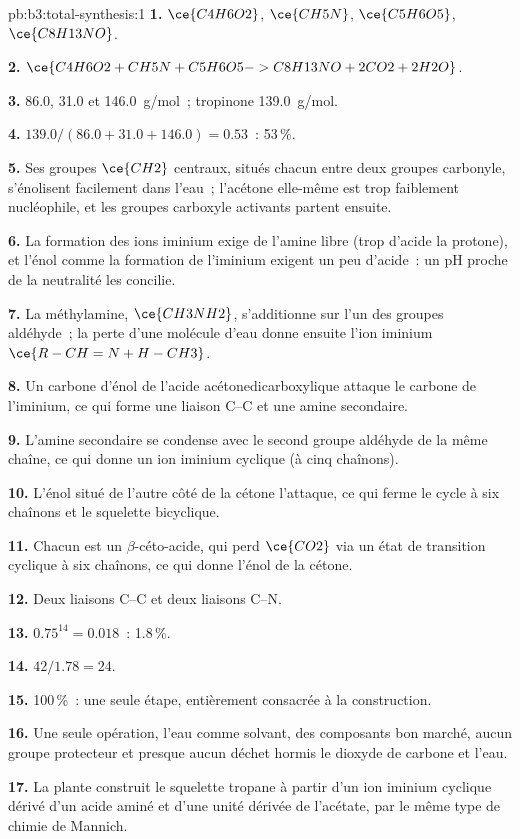 \begin{solution}{pb:b3:total-synthesis:1}
\textbf{1.} $\ce{C4H6O2}$, $\ce{CH5N}$, $\ce{C5H6O5}$, $\ce{C8H13NO}$.

\textbf{2.} $\ce{C4H6O2 + CH5N + C5H6O5 -> C8H13NO + 2CO2 + 2H2O}$.

\textbf{3.} 86.0, 31.0 et \qty{146.0}{g/mol}~; tropinone \qty{139.0}{g/mol}.

\textbf{4.} $139.0/(86.0 + 31.0 + 146.0) = 0.53$~: 53\,\%.

\textbf{5.} Ses groupes $\ce{CH2}$ centraux, situés chacun entre deux groupes carbonyle, s'énolisent facilement dans
l'eau~; l'acétone elle-même est trop faiblement nucléophile, et les groupes
carboxyle activants partent ensuite.

\textbf{6.} La formation des ions iminium exige de l'amine libre (trop
d'acide la protone), et l'énol comme la formation de l'iminium exigent un
peu d'acide~: un pH proche de la neutralité les concilie.

\textbf{7.} La méthylamine, $\ce{CH3NH2}$, s'additionne sur l'un des groupes aldéhyde~; la perte d'une molécule d'eau donne ensuite l'ion iminium
$\ce{R-CH=N+H-CH3}$.

\textbf{8.} Un carbone d'énol de l'acide acétonedicarboxylique attaque le
carbone de l'iminium, ce qui forme une liaison C--C et une amine
secondaire.

\textbf{9.} L'amine secondaire se condense avec le second groupe aldéhyde de
la même chaîne, ce qui donne un ion iminium cyclique (à cinq chaînons).

\textbf{10.} L'énol situé de l'autre côté de la cétone l'attaque, ce qui
ferme le cycle à six chaînons et le squelette bicyclique.

\textbf{11.} Chacun est un $\beta$-céto-acide, qui perd $\ce{CO2}$ via un état de transition cyclique à six
chaînons, ce qui donne l'énol de la cétone.

\textbf{12.} Deux liaisons C--C et deux liaisons C--N.

\textbf{13.} $0.75^{14} = 0.018$~: 1.8\,\%.

\textbf{14.} $42/1.78 = 24$.

\textbf{15.} 100\,\%~: une seule étape, entièrement consacrée à la construction.

\textbf{16.} Une seule opération, l'eau comme solvant, des composants bon
marché, aucun groupe protecteur et presque aucun déchet hormis le dioxyde
de carbone et l'eau.

\textbf{17.} La plante construit le squelette tropane à partir d'un ion
iminium cyclique dérivé d'un acide aminé et d'une unité dérivée de
l'acétate, par le même type de chimie de Mannich.


\end{solution}

